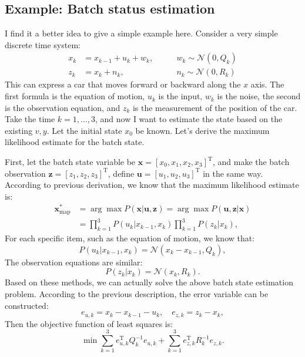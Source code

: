 \subsection{Example: Batch status estimation}
I find it a better idea to give a simple example here. Consider a very simple discrete time system:
\begin{equation}
\begin{array}{lll}
{x_k} &= {x_{k - 1}} + {u_k} + {w_k},&\qquad w_k \sim \mathcal{N}\left( {0,Q_k} \right)\\
{z_k} &= {x_k} + {n_k},&\qquad {n_k}\sim \mathcal{N}\left( {0,R_k} \right)
\end{array}
\end{equation}
This can express a car that moves forward or backward along the $x$ axis. The first formula is the equation of motion, $u_k$ is the input, $w_k$ is the noise, the second is the observation equation, and $z_k$ is the measurement of the position of the car. Take the time $k=1, \ldots, 3$, and now I want to estimate the state based on the existing $v,y$. Let the initial state $x_0$ be known. Let's derive the maximum likelihood estimate for the batch state.

First, let the batch state variable be $\bm{x} = [x_0,x_1, x_2, x_3]^\mathrm{T}$, and make the batch observation $\bm{z} = [z_1,z_2,z_3]^ \mathrm{T}$, define $\bm{u}=[u_1,u_2,u_3]^\mathrm{T}$ in the same way. According to previous derivation, we know that the maximum likelihood estimate is:
\begin{equation}
\begin{aligned}
{\bm{x}_{\mathrm{map}}^*} &= \arg \max P(\bm{x}|\bm{u},\bm{z}) = \arg \max P( \bm{u},\bm{z}|\bm{x})\\
 &= \prod\limits_{k = 1}^3 {P({u_k}|{x_{k - 1}},{x_k})\prod\limits_{k = 1}^3 {P\left( { {z_k}|{x_k}} \right)} },
\end{aligned}
\end{equation}
For each specific item, such as the equation of motion, we know that:
\begin{equation}
P({u_k}|{x_{k - 1}},{x_k}) = \mathcal{N}({x_k} - {x_{k - 1}},{Q_k}),
\end{equation}
The observation equations are similar:
\begin{equation}
P\left( {{z_k}|{x_k}} \right) = \mathcal{N}\left( {{x_k},{R_k}} \right).
\end{equation}
Based on these methods, we can actually solve the above batch state estimation problem. According to the previous description, the error variable can be constructed:
\begin{equation}
{e_{u,k}} = {x_k} - {x_{k - 1}} - {u_k}, \quad {e_{z,k}} = {z_k} - {x_k},
\end{equation}
Then the objective function of least squares is:
\begin{equation}
\min \sum\limits_{k = 1}^3 {e_{u,k}^\mathrm{T} Q_k^{ - 1}{e_{u,k}}} + \sum\limits_{k = 1 }^3 {e_{z,k}^\mathrm{T}{R^{ - 1}_k}{e_{z,k}}}.
\end{equation}

